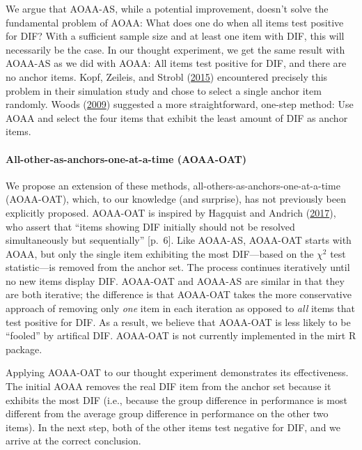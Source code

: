 \documentclass[
  11pt,
]{article}
\begin{document}
We argue that AOAA-AS, while a potential improvement, doesn't solve the fundamental problem of AOAA: What does one do when all items test positive for DIF? With a sufficient sample size and at least one item with DIF, this will necessarily be the case. In our thought experiment, we get the same result with AOAA-AS as we did with AOAA: All items test positive for DIF, and there are no anchor items. Kopf, Zeileis, and Strobl (\protect\hyperlink{ref-kopf2015framework}{2015}) encountered precisely this problem in their simulation study and chose to select a single anchor item randomly. Woods (\protect\hyperlink{ref-woods2009empirical}{2009}) suggested a more straightforward, one-step method: Use AOAA and select the four items that exhibit the least amount of DIF as anchor items.

\hypertarget{all-other-as-anchors-one-at-a-time-aoaa-oat}{%
\paragraph{All-other-as-anchors-one-at-a-time (AOAA-OAT)}\label{all-other-as-anchors-one-at-a-time-aoaa-oat}}

We propose an extension of these methods, all-others-as-anchors-one-at-a-time (AOAA-OAT), which, to our knowledge (and surprise), has not previously been explicitly proposed. AOAA-OAT is inspired by Hagquist and Andrich (\protect\hyperlink{ref-hagquist2017recent}{2017}), who assert that \enquote{items showing DIF initially should not be resolved simultaneously but sequentially} {[}p.~6{]}. Like AOAA-AS, AOAA-OAT starts with AOAA, but only the single item exhibiting the most DIF---based on the \(\chi^2\) test statistic---is removed from the anchor set. The process continues iteratively until no new items display DIF. AOAA-OAT and AOAA-AS are similar in that they are both iterative; the difference is that AOAA-OAT takes the more conservative approach of removing only \emph{one} item in each iteration as opposed to \emph{all} items that test positive for DIF. As a result, we believe that AOAA-OAT is less likely to be \enquote{fooled} by artifical DIF. AOAA-OAT is not currently implemented in the mirt R package.

Applying AOAA-OAT to our thought experiment demonstrates its effectiveness. The initial AOAA removes the real DIF item from the anchor set because it exhibits the most DIF (i.e., because the group difference in performance is most different from the average group difference in performance on the other two items). In the next step, both of the other items test negative for DIF, and we arrive at the correct conclusion.
\end{document}
